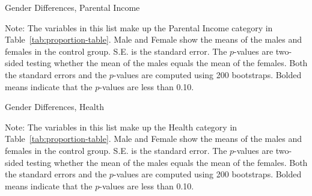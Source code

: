 \begin{table}
\centering
\caption{Gender Differences, Parental Income}\label{tab:tab1-pinc}
\begin{adjustbox}{width=0.9\textwidth}
\begin{threeparttable}

\begin{tablenotes}
\footnotesize
\item Note: The variables in this list make up the Parental Income category in Table~\ref{tab:proportion-table}. Male and Female show the means of the males and females in the control group. S.E. is the standard error. The $p$-values are two-sided testing whether the mean of the males equals the mean of the females. Both the standard errors and the $p$-values are computed using 200 bootstraps. Bolded means indicate that the $p$-values are less than 0.10.
\end{tablenotes}
\end{threeparttable}
\end{adjustbox}
\end{table}

\begin{table}
\centering
\caption{Gender Differences, Health}\label{tab:tab1-health}
\begin{adjustbox}{width=0.9\textwidth}
\begin{threeparttable}

\begin{tablenotes}
\footnotesize
\item Note: The variables in this list make up the Health category in Table~\ref{tab:proportion-table}. Male and Female show the means of the males and females in the control group. S.E. is the standard error. The $p$-values are two-sided testing whether the mean of the males equals the mean of the females. Both the standard errors and the $p$-values are computed using 200 bootstraps. Bolded means indicate that the $p$-values are less than 0.10.
\end{tablenotes}
\end{threeparttable}
\end{adjustbox}
\end{table}

